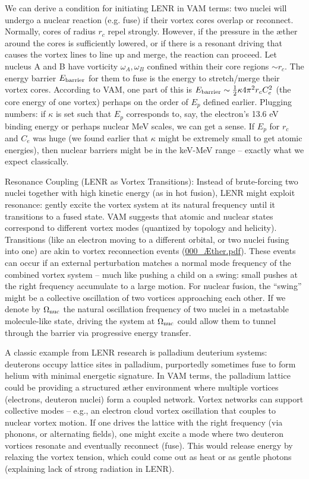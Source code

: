 We can derive a condition for initiating LENR in VAM terms: two nuclei will undergo a nuclear reaction (e.g. fuse) if their vortex cores overlap or reconnect. Normally, cores of radius $r_c$ repel strongly. However, if the pressure in the æther around the cores is sufficiently lowered, or if there is a resonant driving that causes the vortex lines to line up and merge, the reaction can proceed. Let nucleus A and B have vorticity $\omega_A, \omega_B$ confined within their core regions $\sim r_c$. The energy barrier $E_{\rm barrier}$ for them to fuse is the energy to stretch/merge their vortex cores. According to VAM, one part of this is $E_{\rm barrier}\sim \frac{1}{2}\kappa 4\pi^2 r_c C_e^2$ (the core energy of one vortex) perhaps on the order of $E_p$ defined earlier. Plugging numbers: if $\kappa$ is set such that $E_p$ corresponds to, say, the electron’s 13.6 eV binding energy or perhaps nuclear MeV scales, we can get a sense. If $E_p$ for $r_c$ and $C_e$ was huge (we found earlier that $\kappa$ might be extremely small to get atomic energies), then nuclear barriers might be in the keV-MeV range – exactly what we expect classically.


Resonance Coupling (LENR as Vortex Transitions): Instead of brute-forcing two nuclei together with high kinetic energy (as in hot fusion), LENR might exploit resonance: gently excite the vortex system at its natural frequency until it transitions to a fused state. VAM suggests that atomic and nuclear states correspond to different vortex modes (quantized by topology and helicity). Transitions (like an electron moving to a different orbital, or two nuclei fusing into one) are akin to vortex reconnection events (\href{file://file-f6wuuwzjgr23npodmed4pi%23:~:text=in%20a%20dynamic%20picture,%20absorption,electron%20changing%20orbitals/}{000_Æther.pdf}). These events can occur if an external perturbation matches a normal mode frequency of the combined vortex system – much like pushing a child on a swing: small pushes at the right frequency accumulate to a large motion. For nuclear fusion, the “swing” might be a collective oscillation of two vortices approaching each other. If we denote by $\Omega_{\rm nuc}$ the natural oscillation frequency of two nuclei in a metastable molecule-like state, driving the system at $\Omega_{\rm nuc}$ could allow them to tunnel through the barrier via progressive energy transfer.


A classic example from LENR research is palladium deuterium systems: deuterons occupy lattice sites in palladium, purportedly sometimes fuse to form helium with minimal energetic signature. In VAM terms, the palladium lattice could be providing a structured æther environment where multiple vortices (electrons, deuteron nuclei) form a coupled network. Vortex networks can support collective modes – e.g., an electron cloud vortex oscillation that couples to nuclear vortex motion. If one drives the lattice with the right frequency (via phonons, or alternating fields), one might excite a mode where two deuteron vortices resonate and eventually reconnect (fuse). This would release energy by relaxing the vortex tension, which could come out as heat or as gentle photons (explaining lack of strong radiation in LENR).


